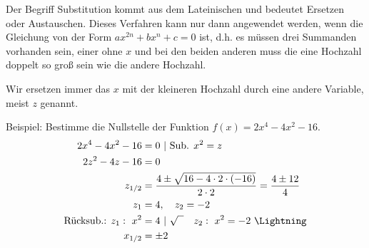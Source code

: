 Der Begriff Substitution kommt aus dem Lateinischen und bedeutet Ersetzen oder Austauschen. Dieses Verfahren kann nur dann angewendet werden, wenn die Gleichung von der Form\newline
\(ax^{2n}+bx^n+c=0\) ist, d.h. es müssen drei Summanden vorhanden sein, einer ohne \(x\) und bei den beiden anderen muss die eine Hochzahl doppelt so groß sein wie die andere Hochzahl.

Wir ersetzen immer das \(x\) mit der kleineren Hochzahl durch eine andere Variable, meist \(z\) genannt.

Beispiel: Bestimme die Nullstelle der Funktion \(f(x)=2x^4-4x^2-16\).
{\large\textcolor{loes}{\begin{align*}
		2x^4-4x^2-16&=0\ \vert\ \text{Sub. }x^2=z\\
		2z^2-4z-16&=0\\
		z_{1/2}&=\frac{4\pm\sqrt{16-4\cdot 2\cdot \left( -16\right) }}{2\cdot 2}=\frac{4\pm 12}{4}\\
		z_1&=4,\quad z_2=-2\\
		\text{Rücksub.: }z_1:\ x^2&=4\ \vert\ \sqrt{\phantom{x}}\quad z_2:\ x^2=-2\ \Lightning\\
		x_{1/2}&=\pm2
\end{align*}}}
\newpage
